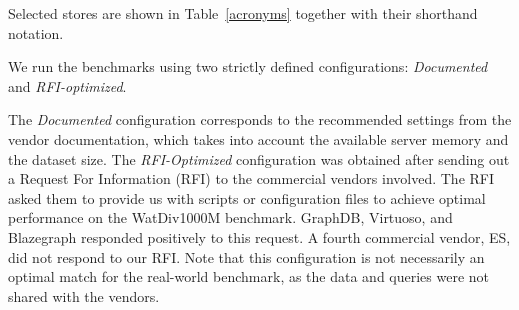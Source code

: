 Selected stores are shown in Table~\ref{acronyms} together with their shorthand notation.

\begin{table}[ht!]
	\centering
	\caption{List of the tested systems and their acronyms.}
	\label{acronyms}

\end{table}



We run the benchmarks using two strictly defined configurations: \emph{Documented} and \emph{RFI-optimized}.  

The \emph{Documented} configuration corresponds to the recommended settings from the vendor
documentation, which takes into account the available server memory and the dataset size.
The \emph{RFI-Optimized} configuration was obtained after sending out a  Request For Information (RFI) to the commercial vendors involved. The RFI asked them to provide us with scripts or configuration files to achieve optimal performance on the WatDiv1000M benchmark. GraphDB, Virtuoso, and Blazegraph responded positively to this request. A fourth commercial vendor, ES, did not respond to our RFI. 
Note that this configuration is not necessarily an optimal match for the real-world benchmark, as the data and queries were not shared with the vendors.

